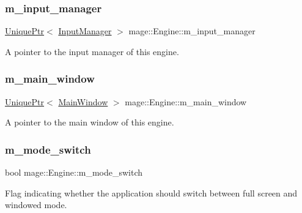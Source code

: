 \subsubsection{\texorpdfstring{m\+\_\+input\+\_\+manager}{m\_input\_manager}}
{\footnotesize\ttfamily \hyperlink{namespacemage_a8c307fbcc33bce9b7f2aa4c26c3b95cf}{Unique\+Ptr}$<$ \hyperlink{classmage_1_1_input_manager}{Input\+Manager} $>$ mage\+::\+Engine\+::m\+\_\+input\+\_\+manager\hspace{0.3cm}{\ttfamily [private]}}

A pointer to the input manager of this engine. \hypertarget{classmage_1_1_engine_a3aea7e8c0c1247cac570334a3d3543d6}{}\label{classmage_1_1_engine_a3aea7e8c0c1247cac570334a3d3543d6} 
\subsubsection{\texorpdfstring{m\+\_\+main\+\_\+window}{m\_main\_window}}
{\footnotesize\ttfamily \hyperlink{namespacemage_a8c307fbcc33bce9b7f2aa4c26c3b95cf}{Unique\+Ptr}$<$ \hyperlink{classmage_1_1_main_window}{Main\+Window} $>$ mage\+::\+Engine\+::m\+\_\+main\+\_\+window\hspace{0.3cm}{\ttfamily [private]}}

A pointer to the main window of this engine. \hypertarget{classmage_1_1_engine_aa5cb2e0b7bb2c4a9020e79ab832ee221}{}\label{classmage_1_1_engine_aa5cb2e0b7bb2c4a9020e79ab832ee221} 
\subsubsection{\texorpdfstring{m\+\_\+mode\+\_\+switch}{m\_mode\_switch}}
{\footnotesize\ttfamily bool mage\+::\+Engine\+::m\+\_\+mode\+\_\+switch\hspace{0.3cm}{\ttfamily [private]}}

Flag indicating whether the application should switch between full screen and windowed mode. \hypertarget{classmage_1_1_engine_a1248b7c21bc8256c72d372c12ed1ee68}{}\label{classmage_1_1_engine_a1248b7c21bc8256c72d372c12ed1ee68} 
